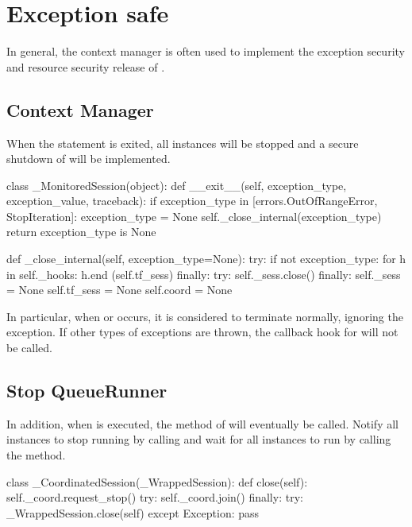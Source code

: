 \section{Exception safe}
\begin{content}
In general, the  context manager is often used to implement the exception security and resource security release of .


\subsection{Context Manager}
When the  statement is exited, all  instances will be stopped and a secure shutdown of  will be implemented.

\begin{leftbar}
\begin{python}
class _MonitoredSession(object):
  def __exit__(self, exception_type, exception_value, traceback):
    if exception_type in [errors.OutOfRangeError, StopIteration]:
      exception_type = None
    self._close_internal(exception_type)
    return exception_type is None
  
  def _close_internal(self, exception_type=None):
    try:
      if not exception_type:
        for h in self._hooks:
          h.end (self.tf_sess)
    finally:
      try:
        self._sess.close()
      finally:
        self._sess = None
        self.tf_sess = None
        self.coord = None  
\end{python}
\end{leftbar}

In particular, when  or  occurs, it is considered to terminate normally, ignoring the exception. If other types of exceptions are thrown, the callback hook for  will not be called.


\subsection{Stop QueueRunner}
In addition, when  is executed, the  method of  will eventually be called. Notify all  instances to stop running by calling  and wait for all  instances to run by calling the  method.

\begin{leftbar}
\begin{python}
class _CoordinatedSession(_WrappedSession):
  def close(self):
    self._coord.request_stop()
    try:
      self._coord.join()
    finally:
      try:
        _WrappedSession.close(self)
      except Exception:
        pass
\end{python}
\end{leftbar}

\end{content}


